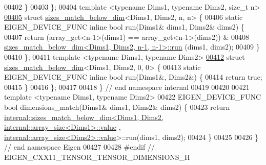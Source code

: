 \begin{DoxyCode}
00402   \}
00403 \};
00404 \textcolor{keyword}{template} <\textcolor{keyword}{typename} Dims1, \textcolor{keyword}{typename} Dims2, \textcolor{keywordtype}{size\_t} n>
\hyperlink{struct_eigen_1_1internal_1_1sizes__match__below__dim_3_01_dims1_00_01_dims2_00_01n_00_01n_01_4}{00405} \textcolor{keyword}{struct }\hyperlink{struct_eigen_1_1internal_1_1sizes__match__below__dim}{sizes\_match\_below\_dim}<Dims1, Dims2, n, n> \{
00406   \textcolor{keyword}{static} EIGEN\_DEVICE\_FUNC  \textcolor{keyword}{inline} \textcolor{keywordtype}{bool} run(Dims1& dims1, Dims2& dims2) \{
00407     \textcolor{keywordflow}{return} (array\_get<n-1>(dims1) == array\_get<n-1>(dims2)) &
00408         \hyperlink{struct_eigen_1_1internal_1_1sizes__match__below__dim}{sizes\_match\_below\_dim<Dims1, Dims2, n-1, n-1>::run}
      (dims1, dims2);
00409   \}
00410 \};
00411 \textcolor{keyword}{template} <\textcolor{keyword}{typename} Dims1, \textcolor{keyword}{typename} Dims2>
\hyperlink{struct_eigen_1_1internal_1_1sizes__match__below__dim_3_01_dims1_00_01_dims2_00_010_00_010_01_4}{00412} \textcolor{keyword}{struct }\hyperlink{struct_eigen_1_1internal_1_1sizes__match__below__dim}{sizes\_match\_below\_dim}<Dims1, Dims2, 0, 0> \{
00413   \textcolor{keyword}{static} EIGEN\_DEVICE\_FUNC  \textcolor{keyword}{inline} \textcolor{keywordtype}{bool} run(Dims1&, Dims2&) \{
00414     \textcolor{keywordflow}{return} \textcolor{keyword}{true};
00415   \}
00416 \};
00417 
00418 \} \textcolor{comment}{// end namespace internal}
00419 
00420 
00421 \textcolor{keyword}{template} <\textcolor{keyword}{typename} Dims1, \textcolor{keyword}{typename} Dims2>
00422 EIGEN\_DEVICE\_FUNC \textcolor{keywordtype}{bool} dimensions\_match(Dims1& dims1, Dims2& dims2) \{
00423   \textcolor{keywordflow}{return} 
      \hyperlink{struct_eigen_1_1internal_1_1sizes__match__below__dim}{internal::sizes\_match\_below\_dim<Dims1, Dims2, internal::array\_size<Dims1>::value}
      , \hyperlink{struct_eigen_1_1internal_1_1array__size}{internal::array\_size<Dims2>::value}>::run(dims1, dims2);
00424 \}
00425 
00426 \} \textcolor{comment}{// end namespace Eigen}
00427 
00428 \textcolor{preprocessor}{#endif // EIGEN\_CXX11\_TENSOR\_TENSOR\_DIMENSIONS\_H}
\end{DoxyCode}
